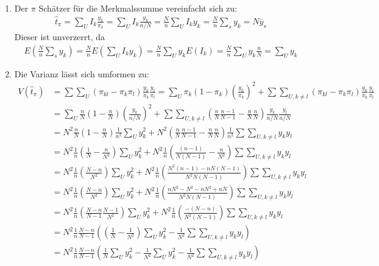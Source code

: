 \documentclass{article}
\begin{document}
\begin{solution}
	\begin{enumerate}
\item Der $\pi$ Schätzer für die Merkmalssumme vereinfacht sich zu:
\begin{align*}
\hat{t}_\pi = \sum_U I_k \frac{y_k}{\pi_k} = \sum_U I_k \frac{y_k}{n/N} = \frac{N}{n} \sum_U I_k y_k =  \frac{N}{n} \sum_s y_k = N \bar{y}_s
\end{align*}
Dieser ist unverzerrt, da
\begin{align*}
E\left(\frac{N}{n} \sum_s y_k\right) = \frac{N}{n} E\left(\sum_U I_k y_k\right) = \frac{N}{n} \sum_U y_k E(I_k) = \frac{N}{n} \sum_U y_k \frac{n}{N} = \sum_U y_k
\end{align*}
\item Die Varianz lässt sich umformen zu:
\begin{align*}
V(\hat{t}_\pi) &= \sum\sum_U (\pi_{kl}-\pi_k\pi_l)\frac{y_k}{\pi_k}\frac{y_l}{\pi_l}= \sum_U \pi_k(1-\pi_k)\left(\frac{y_k}{\pi_k}\right)^2 + \sum\sum_{U,k\neq l} (\pi_{kl}-\pi_k\pi_l)\frac{y_k}{\pi_k}\frac{y_l}{\pi_l}\\
&= \sum_U \frac{n}{N}\left(1-\frac{n}{N}\right)\left(\frac{y_k}{n/N}\right)^2 + \sum\sum_{U,k\neq l}\left(\frac{n}{N}\frac{n-1}{N-1}-\frac{n}{N}\frac{n}{N}\right)\frac{y_k}{n/N}\frac{y_l}{n/N}\\
&= N^2 \frac{n}{N} \left(1-\frac{n}{N}\right)\frac{1}{n^2}\sum_U y_k^2 + N^2\left(\frac{n}{N}\frac{n-1}{N-1}-\frac{n}{N}\frac{n}{N}\right)\frac{1}{n^2} \sum\sum_{U,k\neq l} y_k y_l\\
&= N^2\frac{1}{n}\left(\frac{1}{N}-\frac{n}{N^2}\right)\sum_U y_k^2 + N^2\frac{1}{n} \left(\frac{(n-1)}{N(N-1)}-\frac{n}{N^2}\right)\sum\sum_{U,k\neq l}y_k y_l\\
&= N^2\frac{1}{n}\left(\frac{N-n}{N^2}\right)\sum_U y_k^2 + N^2 \frac{1}{n}\left(\frac{N^2(n-1)-nN(N-1)}{N^2N(N-1)}\right)\sum\sum_{U,k\neq l}y_ky_l\\
&= N^2\frac{1}{n}\left(\frac{N-n}{N^2}\right)\sum_U y_k^2 + N^2 \frac{1}{n}\left(\frac{nN^2-N^2-nN^2+nN}{N^2N(N-1)}\right)\sum\sum_{U,k\neq l}y_ky_l\\
&= N^2\frac{1}{n}\left(\frac{N-n}{N-1}\frac{N-1}{N^2}\right)\sum_U y_k^2 + N^2 \frac{1}{n}\left(\frac{-(N-n)}{N^2(N-1)}\right)\sum\sum_{U,k\neq l}y_ky_l\\
&= N^2\frac{1}{n}\frac{N-n}{N-1}\left(\left(\frac{1}{N}-\frac{1}{N^2}\right)\sum_U y_k^2 - \frac{1}{N^2}\sum\sum_{U,k\neq l}y_k y_l\right)\\
&= N^2\frac{1}{n}\frac{N-n}{N-1}\left(\frac{1}{N}\sum_U y_k^2 - \frac{1}{N^2} \sum_U y_k^2 - \frac{1}{N^2}\sum\sum_{U,k\neq l}y_k y_l\right)\\

\end{align*}
\end{enumerate}
\end{solution}
\end{document}
